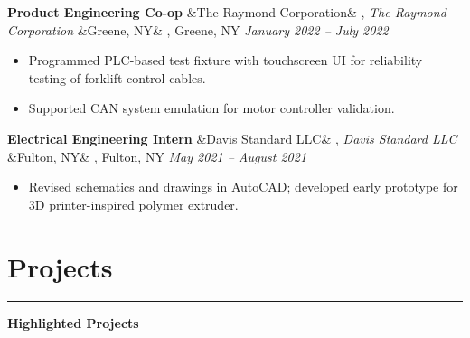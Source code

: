 \documentclass[letterpaper,10pt]{article}
\newcommand{\heading}[1]{%
    \vspace{-5mm} %
    \section*{#1}%
    \vspace{-3mm}%
    \noindent\hrule height 0.5pt %
    \vspace{4mm}%
}
\newcommand{\experience}[5]{%
    \noindent\textbf{#1}%
    \ifx&#2&
    \else
        , \textit{#2}%
    \fi
    \ifx&#3&
    \else
        , #3%
    \fi
    \hfill \textit{#4} \\
    \vspace{-6.8mm}%
    \begin{itemize}[itemsep=-5pt]
        \setlength{\itemindent}{0em}
        #5
    \end{itemize}
    \vspace{1mm}
}
\begin{document}
\experience
    {Product Engineering Co-op}
    {The Raymond Corporation}
    {Greene, NY}
    {January 2022 – July 2022}
    {
        \item Programmed PLC-based test fixture with touchscreen UI for reliability testing of forklift control cables.
        
        \item Supported CAN system emulation for motor controller validation.


    }

\experience
    {Electrical Engineering Intern}
    {Davis Standard LLC}
    {Fulton, NY}
    {May 2021 – August 2021}
    {
        \item Revised schematics and drawings in AutoCAD; developed early prototype for 3D printer-inspired polymer extruder.
        

    }
    


\vspace{-0.5em}
\heading{Projects}
{\Large \noindent\textbf{Highlighted Projects}} \\

    
\end{document}
